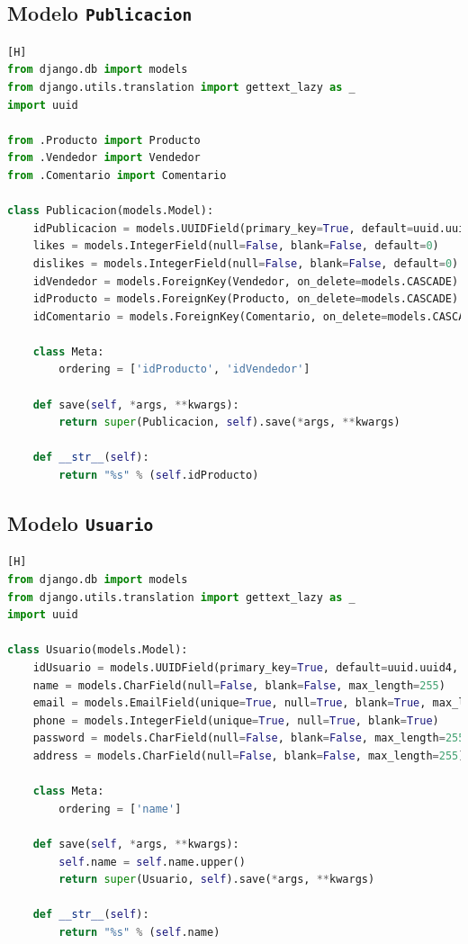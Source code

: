 \documentclass{article}
\begin{document}
\subsection*{Modelo \texttt{Publicacion}}
		  \begin{lstlisting}[language=Python,caption={Publicacion.py}][H]
from django.db import models
from django.utils.translation import gettext_lazy as _
import uuid

from .Producto import Producto
from .Vendedor import Vendedor
from .Comentario import Comentario

class Publicacion(models.Model):
    idPublicacion = models.UUIDField(primary_key=True, default=uuid.uuid4, editable=False)
    likes = models.IntegerField(null=False, blank=False, default=0)
    dislikes = models.IntegerField(null=False, blank=False, default=0)
    idVendedor = models.ForeignKey(Vendedor, on_delete=models.CASCADE)
    idProducto = models.ForeignKey(Producto, on_delete=models.CASCADE)
    idComentario = models.ForeignKey(Comentario, on_delete=models.CASCADE)

    class Meta:
        ordering = ['idProducto', 'idVendedor']

    def save(self, *args, **kwargs):
        return super(Publicacion, self).save(*args, **kwargs)

    def __str__(self):
        return "%s" % (self.idProducto)
    \end{lstlisting}

\subsection*{Modelo \texttt{Usuario}}
		  \begin{lstlisting}[language=Python,caption={Usuario.py}][H]
from django.db import models
from django.utils.translation import gettext_lazy as _
import uuid

class Usuario(models.Model):
    idUsuario = models.UUIDField(primary_key=True, default=uuid.uuid4, editable=False)
    name = models.CharField(null=False, blank=False, max_length=255)
    email = models.EmailField(unique=True, null=True, blank=True, max_length=255)
    phone = models.IntegerField(unique=True, null=True, blank=True)
    password = models.CharField(null=False, blank=False, max_length=255)
    address = models.CharField(null=False, blank=False, max_length=255)

    class Meta:
        ordering = ['name']

    def save(self, *args, **kwargs):
        self.name = self.name.upper()
        return super(Usuario, self).save(*args, **kwargs)

    def __str__(self):
        return "%s" % (self.name)
    \end{lstlisting}
\end{document}
